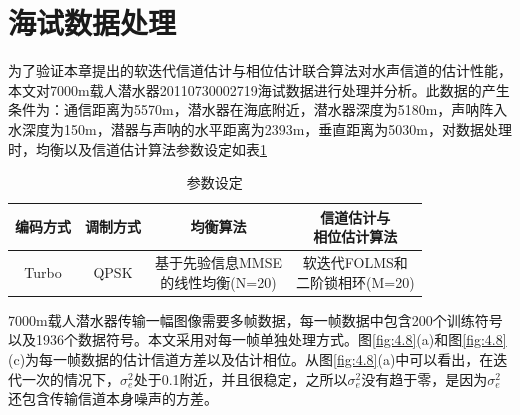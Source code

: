\section{海试数据处理}
为了验证本章提出的软迭代信道估计与相位估计联合算法对水声信道的估计性能，本文对7000m载人潜水器20110730002719海试数据进行处理并分析。此数据的产生条件为：通信距离为5570m，潜水器在海底附近，潜水器深度为5180m，声呐阵入水深度为150m，潜器与声呐的水平距离为2393m，垂直距离为5030m，对数据处理时，均衡以及信道估计算法参数设定如表\ref{tab:4.2}
\begin{table}[hbt]
  \centering
  \caption{参数设定}
  \label{tab:4.2}
  \begin{threeparttable}
  \begin{tabular}{cccc}
    \hline
    编码方式&调制方式&均衡算法&\tabincell{c}{信道估计与\\相位估计算法}\\
    \hline
    Turbo&QPSK&\tabincell{c}{基于先验信息MMSE\\的线性均衡(N=20)}&\tabincell{c}{软迭代FOLMS和\\二阶锁相环(M=20)}\\
    \hline
  \end{tabular}
\end{threeparttable}
\end{table}

7000m载人潜水器传输一幅图像需要多帧数据，每一帧数据中包含200个训练符号以及1936个数据符号。本文采用对每一帧单独处理方式。图\ref{fig:4.8}(a)和图\ref{fig:4.8}(c)为每一帧数据的估计信道方差以及估计相位。从图\ref{fig:4.8}(a)中可以看出，在迭代一次的情况下，$\sigma_e^2$处于0.1附近，并且很稳定，之所以$\sigma_e^2$没有趋于零，是因为$\sigma_e^2$还包含传输信道本身噪声的方差。

